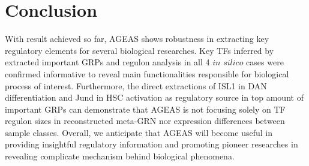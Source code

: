 \documentclass[fleqn,10pt]{wlscirep}
\begin{document}

\section*{Conclusion}
  With result achieved so far, AGEAS shows robustness in extracting key regulatory elements for several biological researches.
  Key TFs inferred by extracted important GRPs and regulon analysis in all 4 $in$ $silico$ cases were confirmed informative to reveal main functionalities responsible for biological process of interest.
  Furthermore, the direct extractions of ISL1 in DAN differentiation and Jund in HSC activation as regulatory source in top amount of important GRPs can demonstrate that AGEAS is not focusing solely on TF regulon sizes in reconstructed meta-GRN nor expression differences between sample classes.
  Overall, we anticipate that AGEAS will become useful in providing insightful regulatory information and promoting pioneer researches in revealing complicate mechanism behind biological phenomena.
\end{document}
